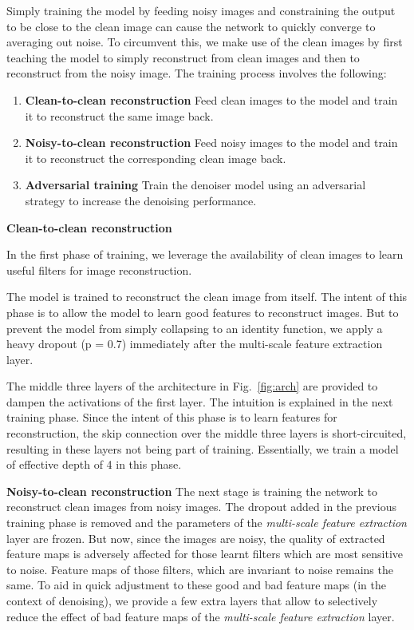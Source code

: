 \documentclass[10pt,twocolumn,letterpaper]{proc}
\begin{document}
Simply training the model by feeding noisy images and constraining the output to be close to the clean image can cause the network to quickly converge to averaging out noise. To circumvent this, we make use of the clean images by first teaching the model to simply reconstruct from clean images and then to reconstruct from the noisy image. 
The training process involves the following:
\begin{enumerate}
   \item \textbf{Clean-to-clean reconstruction} Feed clean images to the model and train it to reconstruct the same image back.
   \item \textbf{Noisy-to-clean reconstruction} Feed noisy images to the model and train it to reconstruct the corresponding clean image back.
   \item \textbf{Adversarial training} Train the denoiser model using an adversarial strategy to increase the denoising performance.
\end{enumerate}


\textbf{Clean-to-clean reconstruction}

In the first phase of training, we leverage the availability of clean images to learn useful filters for image reconstruction.

The model is trained to reconstruct the clean image from itself. The intent of this phase is to allow the model to learn good features to reconstruct images. But to prevent the model from simply collapsing to an identity function, we apply a heavy dropout (p = 0.7) immediately after the multi-scale feature extraction layer. 

The middle three layers of the architecture in Fig.~\ref{fig:arch} are provided to dampen the activations of the first layer. The intuition is explained in the next training phase. Since the intent of this phase is to learn features for reconstruction, the skip connection over the middle three layers is short-circuited, resulting in these layers not being part of training. Essentially, we train a model of effective depth of 4 in this phase.


\textbf{Noisy-to-clean reconstruction} The next stage is training the network to reconstruct clean images from noisy images. The dropout added in the previous training phase is removed and the parameters of the \textit{multi-scale feature extraction} layer are frozen. But now, since the images are noisy, the quality of extracted feature maps is adversely affected for those learnt filters which are most sensitive to noise. Feature maps of those filters, which are invariant to noise remains the same. To aid in quick adjustment to these good and bad feature maps (in the context of denoising), we provide a few extra layers that allow to selectively reduce the effect of bad feature maps of the \textit{multi-scale feature extraction} layer. 
\end{document}

